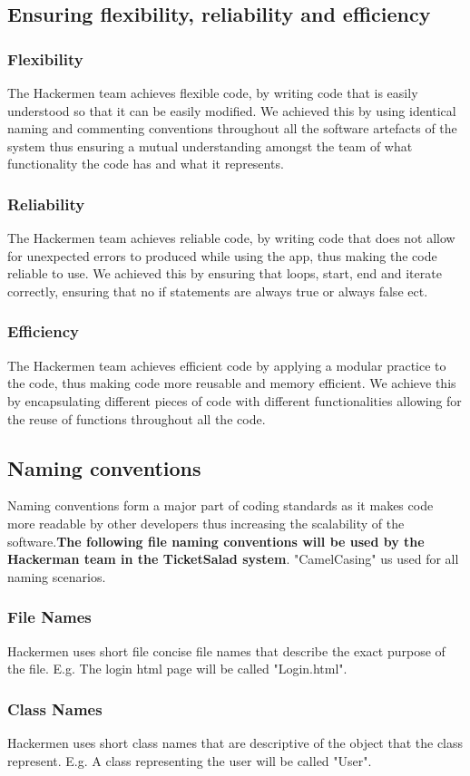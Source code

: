 \documentclass[11pt]{article}
\begin{document}
	\subsection{Ensuring flexibility, reliability and efficiency}
	\subsubsection{Flexibility}
	The Hackermen team achieves flexible code, by writing code that is easily understood so that it can be easily modified. We achieved this by using identical naming and commenting conventions throughout all the software artefacts of the system thus ensuring a mutual understanding amongst the team of what functionality the code has and what it represents.
	\subsubsection{Reliability}
	The Hackermen team achieves reliable code, by writing code that does not allow for unexpected errors to produced while using the app, thus making the code reliable to use. We achieved this by ensuring that loops, start, end and iterate correctly, ensuring that no if statements are always true or always false ect.
	\subsubsection{Efficiency}
	The Hackermen team achieves efficient code by applying a modular practice to the code, thus making code more reusable and memory efficient. We achieve this by encapsulating different pieces of code with different functionalities allowing for the reuse of functions throughout all the code. 
	\subsection{Naming conventions}
	Naming conventions form a major part of coding standards as it makes code more readable by other developers thus increasing the scalability of the software.\textbf{The following file naming conventions will be used by the Hackerman team in the TicketSalad system}. "CamelCasing" us used for all naming scenarios.
	\subsubsection{File Names}
	Hackermen uses short file concise file names that describe the exact purpose of the file. E.g. The login html page will be called "Login.html".
	\subsubsection{Class Names}
	Hackermen uses short class names that are descriptive of the object that the class represent. E.g. A class representing the user will be called "User".
\end{document}
